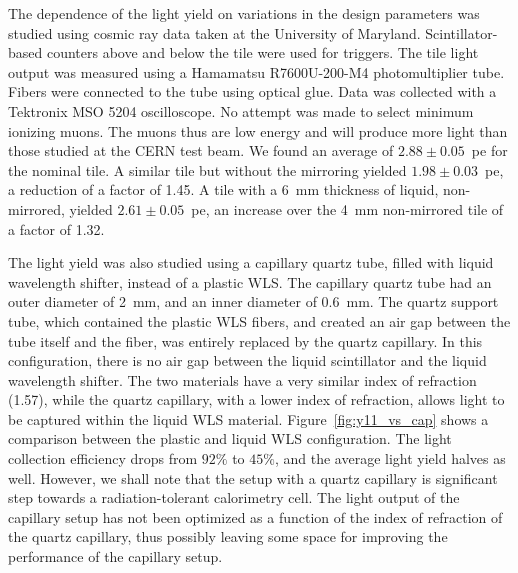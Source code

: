 \documentclass[review]{elsarticle}
\begin{document}
The dependence of the light yield on variations in the design
parameters was studied using cosmic ray data taken at the University
of Maryland. Scintillator-based counters above and below the tile
were used for triggers. The tile light output was measured using a
Hamamatsu R7600U-200-M4 photomultiplier tube. Fibers were connected
to the tube using optical glue. Data was collected with a Tektronix
MSO 5204 oscilloscope. No attempt was made to select minimum ionizing
muons. The muons thus are low energy and will produce more light than
those studied at the CERN test beam. We found an average of 
$2.88\pm 0.05$~pe for the nominal tile. A similar tile but without
the mirroring yielded $1.98\pm 0.03$~pe, a reduction of a factor of
1.45. A tile with a 6~mm thickness of liquid, non-mirrored, yielded
$2.61\pm 0.05$~pe, an increase over the 4~mm non-mirrored tile of a
factor of 1.32.

The light yield was also studied using a capillary quartz tube, filled
with liquid wavelength shifter, instead of a plastic WLS. The
capillary quartz tube had an outer diameter of 2~mm, and an inner
diameter of 0.6~mm.  The quartz support tube, which contained the
plastic WLS fibers, and created an air gap between the tube itself and
the fiber, was entirely replaced by the quartz capillary. In this
configuration, there is no air gap between the liquid scintillator and
the liquid wavelength shifter.  The two materials have a very similar
index of refraction (1.57), while the quartz capillary, with a lower
index of refraction, allows light to be captured within the liquid WLS
material. Figure~\ref{fig:y11_vs_cap} shows a comparison between the
plastic and liquid WLS configuration. The light collection efficiency
drops from $92\%$ to $45\%$, and the average light yield halves as
well. However, we shall note that the setup with a quartz capillary is
significant step towards a radiation-tolerant calorimetry cell. The
light output of the capillary setup has not been optimized as a
function of the index of refraction of the quartz capillary, thus
possibly leaving some space for improving the performance of the
capillary setup.
\end{document}
